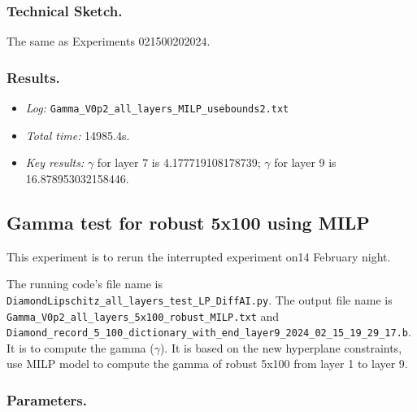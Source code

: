 \documentclass{llncs}
\begin{document}
\subsubsection*{Technical Sketch.}

The same as Experiments 021500202024.

\subsubsection*{Results.}

\begin{itemize}
	\item \emph{Log:} \verb*|Gamma_V0p2_all_layers_MILP_usebounds2.txt|
	
	\item \emph{Total time:} 14985.4s.
	
	\item \emph{Key results:} $\gamma$ for layer 7 is 4.177719108178739; $\gamma$ for layer 9 is 16.878953032158446.
\end{itemize}



\subsection{Gamma test for robust 5x100 using MILP}

This experiment is to rerun the interrupted experiment on14 February night.

\vspace*{1ex}

The running code's file name is \verb*|DiamondLipschitz_all_layers_test_LP_DiffAI.py|. The output file name is \verb*|Gamma_V0p2_all_layers_5x100_robust_MILP.txt| and \verb*|Diamond_record_5_100_dictionary_with_end_layer9_2024_02_15_19_29_17.b|. It is to compute the gamma ($\gamma$). It is based on the new hyperplane constraints, use MILP model to compute the gamma of robust 5x100 from layer 1 to layer 9.


\subsubsection*{Parameters.}
\end{document}
